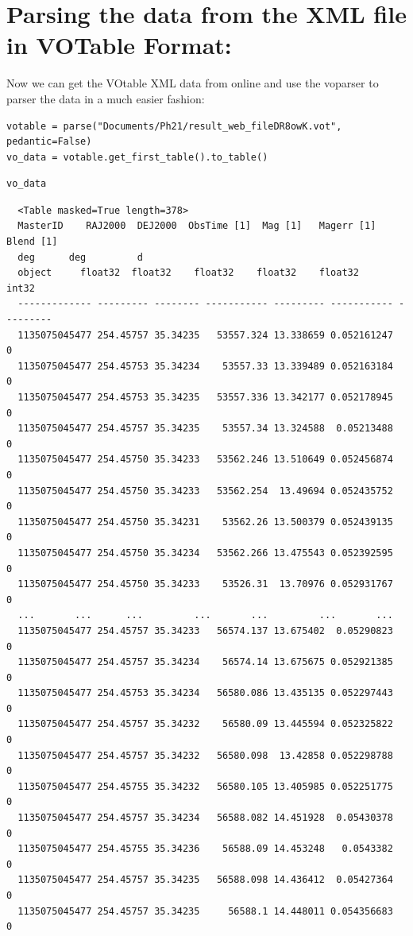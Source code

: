 \documentclass[11pt]{article}
\begin{document}
\section*{Parsing the data from the XML file in VOTable Format:}
\label{sec-5}

Now we can get the VOtable XML data from online and use the voparser to parser
the data in a much easier fashion:

\begin{verbatim}
votable = parse("Documents/Ph21/result_web_fileDR8owK.vot", pedantic=False)
vo_data = votable.get_first_table().to_table()
\end{verbatim}


\begin{verbatim}
vo_data
\end{verbatim}

\begin{verbatim}
  <Table masked=True length=378>
  MasterID    RAJ2000  DEJ2000  ObsTime [1]  Mag [1]   Magerr [1] Blend [1]
  deg      deg         d
  object     float32  float32    float32    float32    float32     int32
  ------------- --------- -------- ----------- --------- ----------- ---------
  1135075045477 254.45757 35.34235   53557.324 13.338659 0.052161247         0
  1135075045477 254.45753 35.34234    53557.33 13.339489 0.052163184         0
  1135075045477 254.45753 35.34235   53557.336 13.342177 0.052178945         0
  1135075045477 254.45757 35.34235    53557.34 13.324588  0.05213488         0
  1135075045477 254.45750 35.34233   53562.246 13.510649 0.052456874         0
  1135075045477 254.45750 35.34233   53562.254  13.49694 0.052435752         0
  1135075045477 254.45750 35.34231    53562.26 13.500379 0.052439135         0
  1135075045477 254.45750 35.34234   53562.266 13.475543 0.052392595         0
  1135075045477 254.45750 35.34233    53526.31  13.70976 0.052931767         0
  ...       ...      ...         ...       ...         ...       ...
  1135075045477 254.45757 35.34233   56574.137 13.675402  0.05290823         0
  1135075045477 254.45757 35.34234    56574.14 13.675675 0.052921385         0
  1135075045477 254.45753 35.34234   56580.086 13.435135 0.052297443         0
  1135075045477 254.45757 35.34232    56580.09 13.445594 0.052325822         0
  1135075045477 254.45757 35.34232   56580.098  13.42858 0.052298788         0
  1135075045477 254.45755 35.34232   56580.105 13.405985 0.052251775         0
  1135075045477 254.45757 35.34234   56588.082 14.451928  0.05430378         0
  1135075045477 254.45755 35.34236    56588.09 14.453248   0.0543382         0
  1135075045477 254.45757 35.34235   56588.098 14.436412  0.05427364         0
  1135075045477 254.45757 35.34235     56588.1 14.448011 0.054356683         0
\end{verbatim}
\end{document}
